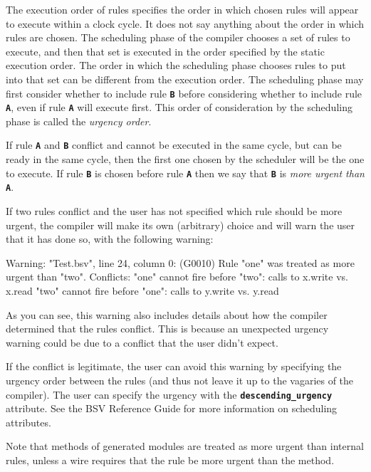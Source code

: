 \documentclass{article}
\newenvironment{centerboxverbatim}
  {\center
   \boxedverbatim}
  {\endboxedverbatim
  {\endcenter }}
\begin{document}
The execution order of rules specifies the order in which chosen rules
will appear to execute within a clock cycle.  It does not say anything
about the order in which rules are chosen.  The scheduling phase of the
compiler chooses a set of rules to execute, and then that set is
executed in the order specified by the static execution order.  The
order in which the scheduling phase chooses rules to put into that set
can be different from the execution order.  The scheduling phase may
first consider whether to include rule {\bf\tt B} before considering
whether to include rule {\bf\tt A}, even if rule {\bf\tt A} will
execute first.  This order of consideration by the scheduling phase
is called the \emph{urgency order}.

If rule {\bf\tt A} and {\bf\tt B} conflict and cannot be executed in the
same cycle, but can be ready in the same cycle, then the first one
chosen by the scheduler will be the one to execute.  If rule {\bf\tt B}
is chosen before rule {\bf\tt A} then we say that {\bf\tt B} is
\emph{more urgent than} {\bf\tt A}.

If two rules conflict and the user has not specified which rule should
be more urgent, the compiler will make its own (arbitrary) choice and
will warn the user that it has done so, with the following warning:

\begin{centerboxverbatim}
Warning: "Test.bsv", line 24, column 0: (G0010)
  Rule "one" was treated as more urgent than "two". Conflicts:
    "one" cannot fire before "two": calls to x.write vs. x.read
    "two" cannot fire before "one": calls to y.write vs. y.read
\end{centerboxverbatim}

As you can see, this warning also includes details about how the compiler
determined that the rules conflict.  This is because an unexpected
urgency warning could be due to a conflict that the user didn't expect.

If the conflict is legitimate, the user can avoid this warning by
specifying the urgency order between the rules (and thus not leave it
up to the vagaries of the compiler).  The user can specify the urgency
with the {\bf\tt descending\_urgency} attribute.  See the BSV
Reference Guide for more information on scheduling attributes.

Note that methods of generated modules are treated as more urgent than
internal rules, unless a wire requires that the rule be more urgent
than the method.
\end{document}

